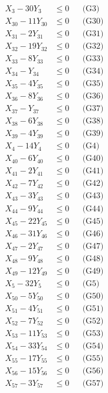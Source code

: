 \documentclass[a4paper,10pt]{article}
\begin{document}
{\begin{align}
X_{3} - 30Y_{3} &\leq 0 && \text{(G3)} \\
\allowbreak
X_{30} - 11Y_{30} &\leq 0 && \text{(G30)} \\
X_{31} - 2Y_{31} &\leq 0 && \text{(G31)} \\
X_{32} - 19Y_{32} &\leq 0 && \text{(G32)} \\
X_{33} - 8Y_{33} &\leq 0 && \text{(G33)} \\
X_{34} - Y_{34} &\leq 0 && \text{(G34)} \\
X_{35} - 4Y_{35} &\leq 0 && \text{(G35)} \\
X_{36} - 8Y_{36} &\leq 0 && \text{(G36)} \\
X_{37} - Y_{37} &\leq 0 && \text{(G37)} \\
X_{38} - 6Y_{38} &\leq 0 && \text{(G38)} \\
X_{39} - 4Y_{39} &\leq 0 && \text{(G39)} \\
X_{4} - 14Y_{4} &\leq 0 && \text{(G4)} \\
X_{40} - 6Y_{40} &\leq 0 && \text{(G40)} \\
X_{41} - 2Y_{41} &\leq 0 && \text{(G41)} \\
X_{42} - 7Y_{42} &\leq 0 && \text{(G42)} \\
X_{43} - 3Y_{43} &\leq 0 && \text{(G43)} \\
X_{44} - 9Y_{44} &\leq 0 && \text{(G44)} \\
X_{45} - 22Y_{45} &\leq 0 && \text{(G45)} \\
X_{46} - 31Y_{46} &\leq 0 && \text{(G46)} \\
X_{47} - 2Y_{47} &\leq 0 && \text{(G47)} \\
X_{48} - 9Y_{48} &\leq 0 && \text{(G48)} \\
\allowbreak
X_{49} - 12Y_{49} &\leq 0 && \text{(G49)} \\
X_{5} - 32Y_{5} &\leq 0 && \text{(G5)} \\
X_{50} - 5Y_{50} &\leq 0 && \text{(G50)} \\
X_{51} - 4Y_{51} &\leq 0 && \text{(G51)} \\
X_{52} - 7Y_{52} &\leq 0 && \text{(G52)} \\
X_{53} - 11Y_{53} &\leq 0 && \text{(G53)} \\
X_{54} - 33Y_{54} &\leq 0 && \text{(G54)} \\
X_{55} - 17Y_{55} &\leq 0 && \text{(G55)} \\
X_{56} - 15Y_{56} &\leq 0 && \text{(G56)} \\
X_{57} - 3Y_{57} &\leq 0 && \text{(G57)} \\

\end{align}}
\end{document}
